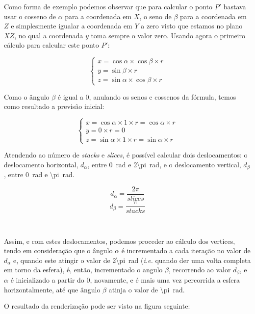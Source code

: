 \documentclass[a4paper, 11pt]{article}
\begin{document}
Como forma de exemplo podemos observar que para calcular o ponto $P'$ bastava usar o cosseno de 
$\alpha$ para a coordenada em $X$, o seno de $\beta$ para a coordenada em $Z$ e simplesmente
igualar a coordenada em $Y$ a zero visto que estamos no plano $XZ$, no qual a coordenada $y$
toma sempre o valor zero. Usando agora o primeiro cálculo para calcular este ponto $P'$:

\begin{equation*}
\begin{cases}
x = \cos\alpha \times \cos\beta \times r \\
y = \sin\beta \times r \\
z = \sin\alpha \times \cos\beta \times r
\end{cases}
\end{equation*}

Como o ângulo $\beta$ é igual a 0, anulando os senos e cossenos da fórmula, temos como resultado 
a previsão inicial:

\begin{equation*}
\begin{cases}
x = \cos\alpha \times 1 \times r = \cos\alpha \times r\\
y = 0 \times r = 0 \\
z = \sin\alpha \times 1 \times r = \sin\alpha \times r
\end{cases}
\end{equation*}

Atendendo ao número de \textit{stacks} e \textit{slices}, é possível calcular dois 
deslocamentos: o deslocamento horizontal,
$d_\alpha$, entre \SI{0}{\radian} e \SI{2\pi}{\radian}, e o deslocamento vertical, $d_\beta$, entre 
\SI{0}{\radian} e
\SI{\pi}{\radian}.

$$d_\alpha = \frac{2\pi}{slices}$$
$$d_\beta = \frac{\pi}{stacks}$$

\

Assim, e com estes deslocamentos, podemos proceder ao cálculo dos vertices, tendo em 
consideração que o ângulo $\alpha$ é incrementado a cada iteração no valor de $d_{\alpha}$ e, 
quando este atingir o valor de \SI{2\pi}{\radian} (\textit{i.e.} quando der uma volta completa
em torno da esfera), é, então, incrementado o angulo $\beta$, recorrendo ao valor $d_{\beta}$,
e $\alpha$ é inicializado a partir do 0, novamente, e é mais uma vez percorrida a esfera 
horizontalmente, até que ângulo $\beta$ atinja o valor de \SI{\pi}{\radian}.

\pagebreak
O resultado da renderização pode ser visto na figura seguinte:
\end{document}
